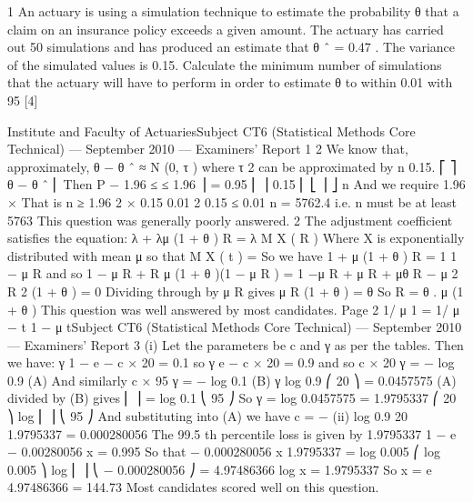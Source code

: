 \documentclass[a4paper,12pt]{article}
\begin{document}
 

1
An actuary is using a simulation technique to estimate the probability θ that a claim on an insurance policy exceeds a given amount. The actuary has carried out 50
simulations and has produced an estimate that θ ˆ = 0.47 . The variance of the simulated values is 0.15.
Calculate the minimum number of simulations that the actuary will have to perform in
order to estimate θ to within 0.01 with 95%
[4]

Institute and Faculty of ActuariesSubject CT6 (Statistical Methods Core Technical) — September 2010 — Examiners’ Report
1
2
We know that, approximately, θ − θ ˆ ≈ N (0, τ ) where τ 2 can be approximated by
n
0.15.
⎡
⎤
θ − θ ˆ
⎢
Then P − 1.96 ≤
≤ 1.96 ⎥ = 0.95
⎢
⎥
0.15
⎢ ⎣
⎥ ⎦
n
And we require 1.96 ×
That is n ≥
1.96 2 × 0.15
0.01 2
0.15
≤ 0.01
n
= 5762.4 i.e. n must be at least 5763
This question was generally poorly answered.
2
The adjustment coefficient satisfies the equation:
λ + λμ (1 + θ ) R = λ M X ( R )
Where X is exponentially distributed with mean μ so that M X ( t ) =
So we have 1 + μ (1 + θ ) R =
1
1 − μ R
and so 1 − μ R + R μ (1 + θ )(1 − μ R ) = 1
−μ R + μ R + μθ R − μ 2 R 2 (1 + θ ) = 0
Dividing through by μ R gives
μ R (1 + θ ) = θ
So R =
θ
.
μ (1 + θ )
This question was well answered by most candidates.
Page 2
1/ μ
1
=
1/ μ − t 1 − μ tSubject CT6 (Statistical Methods Core Technical) — September 2010 — Examiners’ Report
3
(i)
Let the parameters be c and γ as per the tables.
Then we have:
γ
1 − e − c × 20 = 0.1 so
γ
e − c × 20 = 0.9 and so c × 20 γ = − log 0.9 (A)
And similarly c × 95 γ = − log 0.1 (B)
γ
log 0.9
⎛ 20 ⎞
= 0.0457575
(A) divided by (B) gives ⎜ ⎟ =
log 0.1
⎝ 95 ⎠
So γ =
log 0.0457575
= 1.9795337
⎛ 20 ⎞
log ⎜ ⎟
⎝ 95 ⎠
And substituting into (A) we have c = −
(ii)
log 0.9
20 1.9795337
= 0.000280056
The 99.5 th percentile loss is given by
1.9795337
1 − e − 0.00280056 x
= 0.995
So that − 0.000280056 x 1.9795337 = log 0.005
⎛ log 0.005 ⎞
log ⎜
⎟
⎝ − 0.000280056 ⎠ = 4.97486366
log x =
1.9795337
So x = e 4.97486366 = 144.73
Most candidates scored well on this question.
\end{document}
